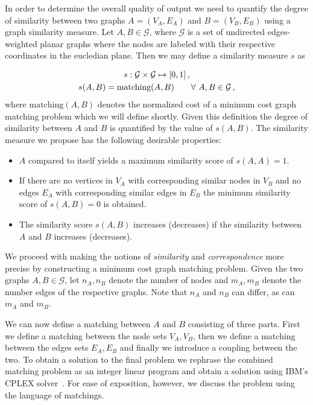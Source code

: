 		In order to determine the overall quality of \NEFIs output we need to quantify the degree of similarity between two graphs $A = (V_A, E_A)$ and $B = (V_B, E_B)$ using a graph similarity measure. Let $A, B \in \mathcal{G}$, where $\mathcal{G}$ is a set of undirected edges-weighted planar graphs where the nodes are labeled with their respective coordinates in the eucledian plane. Then we may define a similarity measure $s$ as
		
		\begin{gather}
		s : \mathcal{G} \times \mathcal{G} \mapsto [0,1]\,, \notag \\
		s(A,B) = \text{matching}(A,B) \quad \quad \forall \ A, B \in \mathcal{G} \,,
		\end{gather}
		where $\text{matching}(A,B)$ denotes the normalized cost of a minimum cost graph matching problem which we will define shortly. Given this definition the degree of similarity between $A$ and $B$ is quantified by the value of $s(A,B)$. The similarity measure we propose has the following desirable properties:


		\begin{itemize}
			\item $A$ compared to itself yields a maximum similarity score of $s(A,A) = 1$.
			\item If there are no vertices in $V_A$ with corresponding similar nodes in $V_B$ and no edges $E_A$ with corresponding similar edges in $E_B$ the minimum similarity score of $s(A,B) = 0$ is obtained.
			\item The similarity score $s(A,B)$ increases (decreases) if the similarity between $A$ and $B$ increases (decreases).
		\end{itemize}

		We proceed with making the notions of \emph{similarity} and \emph{correspondence} more precise by constructing a minimum cost graph matching problem. Given the two graphs $A,B \in \mathcal{G}$, let $n_A,n_B$ denote the number of nodes and $m_A,m_B$ denote the number edges of the respective graphs. Note that $n_A$ and $n_B$ can differ, as can $m_A$ and $m_B$.

		We can now define a matching between $A$ and $B$ consisting of three parts. First we define a matching between the node sets $V_A, V_B$, then we define a matching between the edges sets $E_A, E_B$ and finally we introduce a coupling between the two. To obtain a solution to the final problem we rephrase the combined matching problem as an integer linear program and obtain a solution using IBM's CPLEX solver~\cite{cplex2005high}. For ease of exposition, however, we discuss the problem using the language of matchings.

